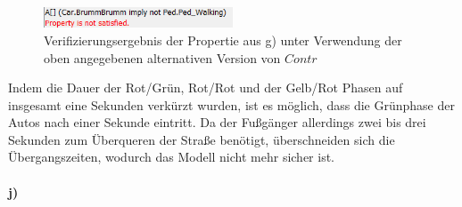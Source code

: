 \begin{figure}[H] 
	\centering 
	\includegraphics[width=0.5\textwidth]{./UPAAAL_Screens/2i_Verified}
	\caption[Aufgabe 2i)]{Verifizierungsergebnis der Propertie aus g) unter Verwendung der oben angegebenen alternativen Version von $Contr$}    
\end{figure}

Indem die Dauer der Rot/Grün, Rot/Rot und der Gelb/Rot Phasen auf insgesamt eine Sekunden verkürzt wurden, ist es möglich, dass die Grünphase der Autos nach einer Sekunde eintritt. Da der Fußgänger allerdings zwei bis drei Sekunden zum Überqueren der Straße benötigt, überschneiden sich die Übergangszeiten, wodurch das Modell nicht mehr sicher ist. 




\paragraph{j)}\mbox{} \\

